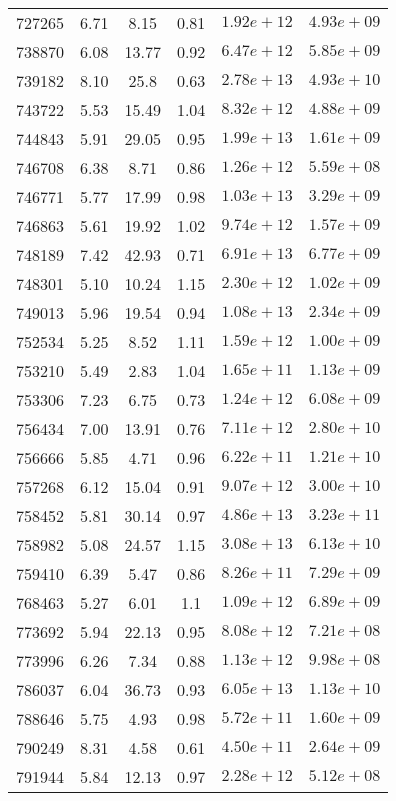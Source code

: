 \begin{table}
\begin{tabular}{cccccc}
727265 & 6.71 & 8.15 & 0.81 & $1.92e+12$ & $4.93e+09$ \\
738870 & 6.08 & 13.77 & 0.92 & $6.47e+12$ & $5.85e+09$ \\
739182 & 8.10 & 25.8 & 0.63 & $2.78e+13$ & $4.93e+10$ \\
743722 & 5.53 & 15.49 & 1.04 & $8.32e+12$ & $4.88e+09$ \\
744843 & 5.91 & 29.05 & 0.95 & $1.99e+13$ & $1.61e+09$ \\
746708 & 6.38 & 8.71 & 0.86 & $1.26e+12$ & $5.59e+08$ \\
746771 & 5.77 & 17.99 & 0.98 & $1.03e+13$ & $3.29e+09$ \\
746863 & 5.61 & 19.92 & 1.02 & $9.74e+12$ & $1.57e+09$ \\
748189 & 7.42 & 42.93 & 0.71 & $6.91e+13$ & $6.77e+09$ \\
748301 & 5.10 & 10.24 & 1.15 & $2.30e+12$ & $1.02e+09$ \\
749013 & 5.96 & 19.54 & 0.94 & $1.08e+13$ & $2.34e+09$ \\
752534 & 5.25 & 8.52 & 1.11 & $1.59e+12$ & $1.00e+09$ \\
753210 & 5.49 & 2.83 & 1.04 & $1.65e+11$ & $1.13e+09$ \\
753306 & 7.23 & 6.75 & 0.73 & $1.24e+12$ & $6.08e+09$ \\
756434 & 7.00 & 13.91 & 0.76 & $7.11e+12$ & $2.80e+10$ \\
756666 & 5.85 & 4.71 & 0.96 & $6.22e+11$ & $1.21e+10$ \\
757268 & 6.12 & 15.04 & 0.91 & $9.07e+12$ & $3.00e+10$ \\
758452 & 5.81 & 30.14 & 0.97 & $4.86e+13$ & $3.23e+11$ \\
758982 & 5.08 & 24.57 & 1.15 & $3.08e+13$ & $6.13e+10$ \\
759410 & 6.39 & 5.47 & 0.86 & $8.26e+11$ & $7.29e+09$ \\
768463 & 5.27 & 6.01 & 1.1 & $1.09e+12$ & $6.89e+09$ \\
773692 & 5.94 & 22.13 & 0.95 & $8.08e+12$ & $7.21e+08$ \\
773996 & 6.26 & 7.34 & 0.88 & $1.13e+12$ & $9.98e+08$ \\
786037 & 6.04 & 36.73 & 0.93 & $6.05e+13$ & $1.13e+10$ \\
788646 & 5.75 & 4.93 & 0.98 & $5.72e+11$ & $1.60e+09$ \\
790249 & 8.31 & 4.58 & 0.61 & $4.50e+11$ & $2.64e+09$ \\
791944 & 5.84 & 12.13 & 0.97 & $2.28e+12$ & $5.12e+08$ \\

\end{tabular}
\end{table}
